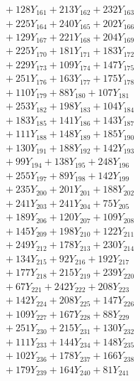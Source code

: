 \documentclass[a4paper,10pt]{article}
\begin{document}
{\begin{align}
&\;  + 128 Y_{161} + 213 Y_{162} + 232 Y_{163} \\[0.3ex]
&\;  + 225 Y_{164} + 240 Y_{165} + 202 Y_{166} \\[0.3ex]
&\;  + 129 Y_{167} + 221 Y_{168} + 204 Y_{169} \\[0.3ex]
&\;  + 225 Y_{170} + 181 Y_{171} + 183 Y_{172} \\[0.3ex]
&\;  + 229 Y_{173} + 109 Y_{174} + 147 Y_{175} \\[0.3ex]
&\;  + 251 Y_{176} + 163 Y_{177} + 175 Y_{178} \\[0.5ex]\allowbreak
&\;  + 110 Y_{179} + 88 Y_{180} + 107 Y_{181} \\[0.3ex]
&\;  + 253 Y_{182} + 198 Y_{183} + 104 Y_{184} \\[0.3ex]
&\;  + 183 Y_{185} + 141 Y_{186} + 143 Y_{187} \\[0.3ex]
&\;  + 111 Y_{188} + 148 Y_{189} + 185 Y_{190} \\[0.3ex]
&\;  + 130 Y_{191} + 188 Y_{192} + 142 Y_{193} \\[0.3ex]
&\;  + 99 Y_{194} + 138 Y_{195} + 248 Y_{196} \\[0.3ex]
&\;  + 255 Y_{197} + 89 Y_{198} + 142 Y_{199} \\[0.3ex]
&\;  + 235 Y_{200} + 201 Y_{201} + 188 Y_{202} \\[0.3ex]
&\;  + 241 Y_{203} + 241 Y_{204} + 75 Y_{205} \\[0.3ex]
&\;  + 189 Y_{206} + 120 Y_{207} + 109 Y_{208} \\[0.5ex]\allowbreak
&\;  + 145 Y_{209} + 198 Y_{210} + 122 Y_{211} \\[0.3ex]
&\;  + 249 Y_{212} + 178 Y_{213} + 230 Y_{214} \\[0.3ex]
&\;  + 134 Y_{215} + 92 Y_{216} + 192 Y_{217} \\[0.3ex]
&\;  + 177 Y_{218} + 215 Y_{219} + 239 Y_{220} \\[0.3ex]
&\;  + 67 Y_{221} + 242 Y_{222} + 208 Y_{223} \\[0.3ex]
&\;  + 142 Y_{224} + 208 Y_{225} + 147 Y_{226} \\[0.3ex]
&\;  + 109 Y_{227} + 167 Y_{228} + 88 Y_{229} \\[0.3ex]
&\;  + 251 Y_{230} + 215 Y_{231} + 130 Y_{232} \\[0.3ex]
&\;  + 111 Y_{233} + 144 Y_{234} + 148 Y_{235} \\[0.3ex]
&\;  + 102 Y_{236} + 178 Y_{237} + 166 Y_{238} \\[0.5ex]\allowbreak
&\;  + 179 Y_{239} + 164 Y_{240} + 81 Y_{241} \\[0.3ex]

\end{align}}
\end{document}
